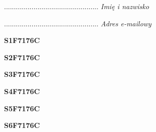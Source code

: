 \begin{turn}{90}\begin{minipage}{\linewidth} \vspace{20mm} ................................................  \textit{Imię i nazwisko}\end{minipage}\end{turn}

\begin{turn}{90}\begin{minipage}{\linewidth} \vspace{20mm} ................................................  \textit{Adres e-mailowy}\end{minipage}\end{turn}

\begin{turn}{90}\huge \begin{minipage}{\linewidth} \vspace{10mm}\textbf{S1F7176C}\end{minipage}\end{turn}

\begin{turn}{90}\huge \begin{minipage}{\linewidth} \vspace{10mm}\textbf{S2F7176C}\end{minipage}\end{turn}

\begin{turn}{90}\huge \begin{minipage}{\linewidth} \vspace{10mm}\textbf{S3F7176C}\end{minipage}\end{turn}

\begin{turn}{90}\huge \begin{minipage}{\linewidth} \vspace{10mm}\textbf{S4F7176C}\end{minipage}\end{turn}

\begin{turn}{90}\huge \begin{minipage}{\linewidth} \vspace{10mm}\textbf{S5F7176C}\end{minipage}\end{turn}

\begin{turn}{90}\huge \begin{minipage}{\linewidth} \vspace{10mm}\textbf{S6F7176C}\end{minipage}\end{turn}

